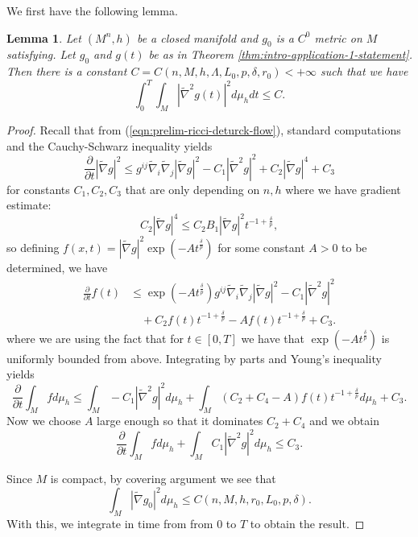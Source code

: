\documentclass[12pt]{amsart}
\theoremstyle{plain}
\theoremstyle{plain}
\newtheorem{lemma}[subsection]{Lemma}
\theoremstyle{definition}
\theoremstyle{remark}
\numberwithin{equation}{subsection}
\newcommand{\hdel}{\tilde{\nabla}}
\begin{document}
We first have the following lemma.

\begin{lemma}\label{lem:hessiansquared-spacetime-integrability}
    Let $(M^n,h)$ be a closed manifold and $g_0$ is a $C^0$ metric on $M$ satisfying. Let $g_0$ and $g(t)$ be as in Theorem \ref{thm:intro-application-1-statement}. Then there is a constant $C = C(n, M,h, \Lambda, L_0, p, \delta,r_0) < +\infty$ such that we have
    \begin{equation*}
        \int_0^T \int_M |\hdel^2 g(t)|^2 d\mu_h dt \leq C.
    \end{equation*}
\end{lemma}

\begin{proof}
    Recall that from (\ref{eqn:prelim-ricci-deturck-flow}), standard computations and the Cauchy-Schwarz inequality yields
    \begin{equation*}
        \frac{\partial}{\partial t} |\hdel g|^2 \leq g^{ij}\hdel_i\hdel_j |\hdel g|^2 - C_1 |\hdel^2 g|^2 + C_2|\hdel g|^4 + C_3
    \end{equation*}
    for constants $C_1, C_2, C_3$ that are only depending on $n, h$ where we have gradient estimate:
    \begin{equation*}
        C_2|\hdel g|^4 \leq C_2B_1|\hdel g|^2t^{-1+\frac{\delta}{p}},
    \end{equation*}
    so defining $f(x,t) = |\hdel g|^2\exp\left(-At^\frac{\delta}{p}\right)$ for some constant $A > 0$ to be determined, we have
    \begin{align*}
        \frac{\partial}{\partial t} f(t) &\leq \exp\left(-At^\frac{\delta}{p}\right)g^{ij}\hdel_i\hdel_j|\hdel g|^2 - C_1|\hdel^2 g|^2 \nonumber \\
        &\quad + C_2f(t)t^{-1+\frac{\delta}{p}} - Af(t)t^{-1+\frac{\delta}{p}} + C_3.
    \end{align*}
    where we are using the fact that for $t \in [0, T]$ we have that $\exp\left(-At^\frac{\delta}{p}\right)$ is uniformly bounded from above. Integrating by parts and Young's inequality yields
    \begin{equation*}
        \frac{\partial}{\partial t} \int_M fd\mu_h \leq \int_M -C_1|\hdel^2g|^2d\mu_h + \int_M\left(C_2+C_4-A\right)f(t)t^{-1+\frac{\delta}{p}}d\mu_h + C_3.
    \end{equation*}
    Now we choose $A$ large enough so that it dominates $C_2 + C_4$ and we obtain
    \begin{equation*}
        \frac{\partial}{\partial t} \int_M fd\mu_h + \int_M C_1|\hdel^2 g|^2d\mu_h \leq C_3.
    \end{equation*}
    
Since $M$ is compact, by covering argument we see that 
\begin{equation}
\int_M |\tilde\nabla g_0|^2 d\mu_h \leq C(n,M,h,r_0,L_0,p,\delta).
\end{equation} 
With this, we integrate in time from from $0$ to $T$ to obtain the result.
\end{proof}
\end{document}
